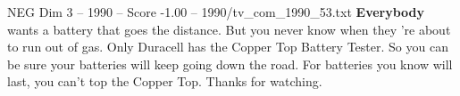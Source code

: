\begin{textsample}{NEG Dim 3 – 1990 – Score -1.00 – 1990/tv\_com\_1990\_53.txt}  \label{ex:f3_neg_023}
\textbf{Everybody} wants a battery that goes the distance.
But you never know when they 're about to run out of gas.
Only Duracell has the Copper Top Battery Tester.
So you can be sure your batteries will keep going down the road.
For batteries you know will last, you can't top the Copper Top.
Thanks for watching.

\end{textsample}
